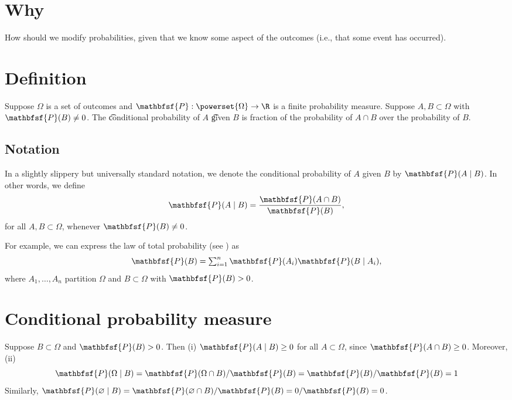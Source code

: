 

\section*{Why}

How should we modify probabilities, given that we know some aspect of the outcomes (i.e., that some event has occurred).

\section*{Definition}

Suppose $\Omega $ is a set of outcomes and $\mathbfsf{P} : \powerset{\Omega } \to \R $ is a finite probability measure.
Suppose $A, B \subset \Omega $ with $\mathbfsf{P} (B) \neq 0$.
The \t{conditional probability} of $A$ \t{given} $B$ is fraction of the probability of $A \cap  B$ over the probability of $B$.

\subsection*{Notation}

In a slightly slippery but universally standard notation, we denote the conditional probability of $A$ given $B$ by $\mathbfsf{P} (A \mid  B)$.
In other words, we define
    \[
\mathbfsf{P} (A \mid  B) = \frac{\mathbfsf{P} (A \cap B)}{\mathbfsf{P} (B)},
    \]
for all $A, B \subset \Omega $, whenever $\mathbfsf{P} (B) \neq 0$.

For example, we can express the law of total probability (see ) as
    \[
\textstyle
\mathbfsf{P} (B) = \sum_{i = 1}^{n} \mathbfsf{P} (A_i)\mathbfsf{P} (B \mid  A_i),
    \]
where $A_1, \dots , A_n$ partition $\Omega $ and $B \subset \Omega $ with $\mathbfsf{P} (B) > 0$.

\section*{Conditional probability measure}

Suppose $B \subset \Omega $ and $\mathbfsf{P} (B) > 0$.
Then (i) $\mathbfsf{P} (A \mid  B) \geq 0$ for all $A \subset \Omega $, since $\mathbfsf{P} (A \cap  B) \geq 0$.
Moreover, (ii)
    \[
\mathbfsf{P} (\Omega  \mid  B) = \mathbfsf{P} (\Omega  \cap B)/\mathbfsf{P} (B) = \mathbfsf{P} (B)/\mathbfsf{P} (B) = 1
    \]
Similarly, $\mathbfsf{P} (\varnothing \mid  B) = \mathbfsf{P} (\varnothing \cap  B)/\mathbfsf{P} (B) = 0/\mathbfsf{P} (B) = 0$.

